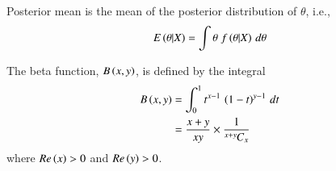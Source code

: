 \begin{definition}
    Posterior mean is the mean of the posterior distribution of $\theta$, i.e., 
    \begin{align}
        E\left(\theta|X\right) = \int{\theta\;f\ensuremath{\left(\theta|X\right)}\,d\theta}\label{stats/7/eq5}
    \end{align}
    \end{definition}
    \begin{definition}
    The beta function, $B\left(x,y\right)$, is defined by the integral
    \begin{align}
        B\left(x,y\right) &= \int_0^1 t^{x-1}\,\left(1-t\right)^{y-1}\,dt\nonumber\\
        &= \frac{x+y}{xy}\times \frac{1}{{{}^{x+y}\mkern-1muC_{x}}}\label{stats/7/eq1}
    \end{align}
    where $Re\left(x\right)>0$ and $Re\left(y\right)>0$.
    \end{definition}
    

